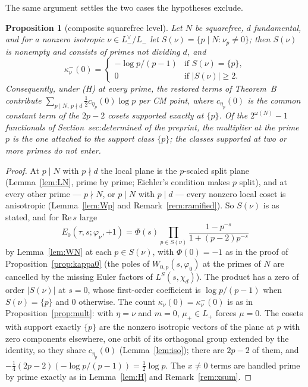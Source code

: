 \documentclass[11pt,reqno]{amsart}
\theoremstyle{plain}
\newtheorem{proposition}[theorem]{Proposition}
\theoremstyle{definition}
\newcommand{\Lm}{L_{-}}
\newcommand{\Lp}{L_{+}}
\begin{document}
The same argument settles the two cases the hypotheses exclude.

\begin{proposition}[composite squarefree level]\label{prop:composite}
Let $N$ be squarefree, $d$ fundamental, and for a nonzero isotropic $\nu\in\Lm^\vee/\Lm$ let
$S(\nu)=\{p\mid N:\nu_p\neq0\}$; then $S(\nu)$ is nonempty and consists of primes not dividing
$d$, and
\[
  \kappa^-_\nu(0)=\begin{cases}-\log p/(p-1)&\text{if }S(\nu)=\{p\},\\ 0&\text{if }\lvert S(\nu)
  \rvert\ge2.\end{cases}
\]
Consequently, under (H) at every prime, the restored terms of Theorem~B contribute
$\sum_{p\mid N,\,p\nmid d}\tfrac12c_{\eta_p}(0)\log p$ per CM point, where $c_{\eta_p}(0)$ is the
common constant term of the $2p-2$ cosets supported exactly at $\{p\}$. Of the $2^{\omega(N)}-1$
functionals of \textup{Section~sec:determined of the preprint}, the multiplier at the prime $p$ is the one attached to the
support class $\{p\}$; the classes supported at two or more primes do not enter.
\end{proposition}
\begin{proof}
At $p\mid N$ with $p\nmid d$ the local plane is the $p$-scaled split plane (Lemma~\ref{lem:LN},
prime by prime; Eichler's condition makes $p$ split), and at every other prime --- $p\nmid N$, or
$p\mid N$ with $p\mid d$ --- every nonzero local coset is anisotropic (Lemma~\ref{lem:Wp} and
Remark~\ref{rem:ramified}). So $S(\nu)$ is as stated, and for $\mathrm{Re}\,s$ large
\[
  E_0(\tau,s;\varphi_\nu,+1)=\Phi(s)\prod_{p\in S(\nu)}\frac{1-p^{-s}}{1+(p-2)p^{-s}}
\]
by Lemma~\ref{lem:WN} at each $p\in S(\nu)$, with $\Phi(0)=-1$ as in the proof of
Proposition~\ref{prop:kappa0} (the poles of $W_{0,p}(s,\varphi_0)$ at the primes of $N$ are
cancelled by the missing Euler factors of $L^S(s,\chi_d)$). The product has a zero of order
$\lvert S(\nu)\rvert$ at $s=0$, whose first-order coefficient is $\log p/(p-1)$ when
$S(\nu)=\{p\}$ and $0$ otherwise. The count $\kappa_\nu(0)=\kappa^-_\nu(0)$ is as in
Proposition~\ref{prop:mult}: with $\eta=\nu$ and $m=0$, $\mu_+\in\Lp$ forces $\mu=0$. The cosets
with support exactly $\{p\}$ are the nonzero isotropic vectors of the plane at $p$ with zero
components elsewhere, one orbit of its orthogonal group extended by the identity, so they share
$c_{\eta_p}(0)$ (Lemma~\ref{lem:iso}); there are $2p-2$ of them, and
$-\tfrac14(2p-2)(-\log p/(p-1))=\tfrac12\log p$. The $x\neq0$ terms are handled prime by prime
exactly as in Lemma~\ref{lem:H} and Remark~\ref{rem:xsum}.
\end{proof}
\end{document}
